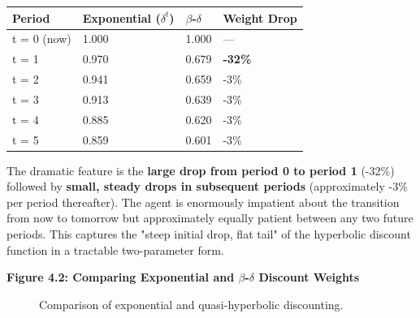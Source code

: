 \documentclass[12pt, letterpaper]{article}
\begin{document}
\begin{table}[H]
\centering
\small
\begin{tabularx}{\linewidth}{lYYY}
\toprule
Period & Exponential ($\delta^t$) & $\beta$-$\delta$ & Weight Drop \\
\midrule
t = 0 (now) & 1.000 & 1.000 & --- \\
t = 1 & 0.970 & 0.679 & \textbf{-32\%} \\
t = 2 & 0.941 & 0.659 & -3\% \\
t = 3 & 0.913 & 0.639 & -3\% \\
t = 4 & 0.885 & 0.620 & -3\% \\
t = 5 & 0.859 & 0.601 & -3\% \\
\bottomrule
\end{tabularx}
\end{table}


The dramatic feature is the \textbf{large drop from period 0 to period 1} (-32\%) followed by \textbf{small, steady drops in subsequent periods} (approximately -3\% per period thereafter). The agent is enormously impatient about the transition from now to tomorrow but approximately equally patient between any two future periods. This captures the "steep initial drop, flat tail" of the hyperbolic discount function in a tractable two-parameter form.

\textbf{Figure 4.2: Comparing Exponential and $\beta$-$\delta$ Discount Weights}

\begin{figure}[ht]
\centering


\caption{Comparison of exponential and quasi-hyperbolic discounting.}
\end{figure}
\end{document}

